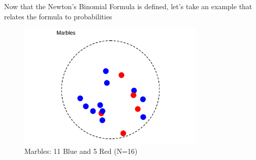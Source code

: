 \documentclass{article}
\begin{document}
Now that the Newton's Binomial Formula is defined, let's take an example that relates the formula to probabilities 
\begin{figure}[h!]
    \centering
    \includegraphics[width=0.8\textwidth]{Marbles.png}
    \caption{Marbles: 11 Blue and 5 Red (N=16)}
    \label{fig:marbles}
\end{figure}
\end{document}
